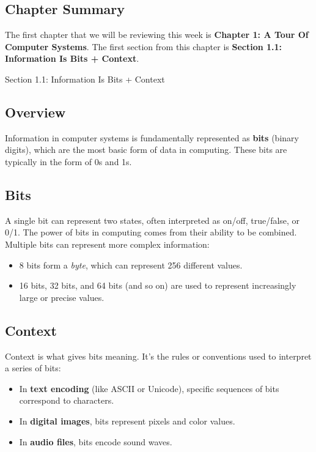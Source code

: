 \subsection{Chapter Summary}

The first chapter that we will be reviewing this week is \textbf{Chapter 1: A Tour Of Computer Systems}. The first section from this chapter is \textbf{Section 1.1: Information Is Bits + Context}.

\begin{notes}{Section 1.1: Information Is Bits + Context}
    \subsection*{Overview}

    Information in computer systems is fundamentally represented as \textbf{bits} (binary digits), which are the most basic form of data in computing. These bits are typically in the form of 0s and 1s. \vspace*{1em}
    
    \subsection*{Bits}

    A single bit can represent two states, often interpreted as on/off, true/false, or 0/1. The power of bits in computing comes from their ability to be combined. Multiple bits can represent more complex 
    information:

    \begin{itemize}
        \item 8 bits form a \textit{byte}, which can represent 256 different values.
        \item 16 bits, 32 bits, and 64 bits (and so on) are used to represent increasingly large or precise values.
    \end{itemize}
    
    \subsection*{Context}

    Context is what gives bits meaning. It's the rules or conventions used to interpret a series of bits:

    \begin{itemize}
        \item In \textbf{text encoding} (like ASCII or Unicode), specific sequences of bits correspond to characters.
        \item In \textbf{digital images}, bits represent pixels and color values.
        \item In \textbf{audio files}, bits encode sound waves.
    \end{itemize}


\end{notes}
